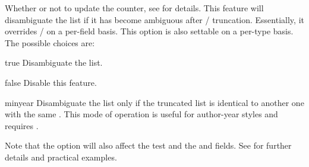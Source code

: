 \documentclass{ltxdockit}[2011/03/25]
\begin{document}
\begin{optionlist}
Whether or not to update the  counter, see  for details. This feature will disambiguate the  list if it has become ambiguous after \slash {} truncation. Essentially, it overrides \slash {} on a per-field basis. This option is also settable on a per-type basis. The possible choices are:

\begin{valuelist}
\item[true] Disambiguate the  list.
\item[false] Disable this feature.
\item[minyear] Disambiguate the  list only if the truncated list is identical to another one with the same . This mode of operation is useful for author-year styles and requires .
\end{valuelist}
%
Note that the  option will also affect the  test and the  and  fields. See  for further details and practical examples.

\end{optionlist}
\end{document}
